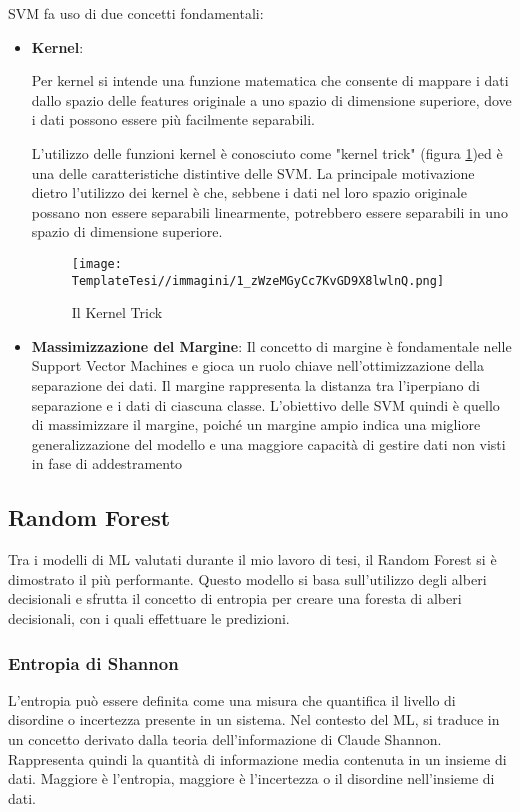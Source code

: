 \begin{flushleft}
SVM fa uso di due concetti fondamentali:

\begin{itemize}
\item \textbf{Kernel}:

     Per kernel si intende una funzione matematica che consente di mappare i dati dallo spazio delle features originale a uno spazio di dimensione superiore, dove i dati possono essere più facilmente separabili.

     L'utilizzo delle funzioni kernel è conosciuto come "kernel trick" (figura \ref{fig:kerneltrick})ed è una delle caratteristiche distintive delle SVM. La principale motivazione dietro l'utilizzo dei kernel è che, sebbene i dati nel loro spazio originale possano non essere separabili linearmente, potrebbero essere separabili in uno spazio di dimensione superiore.
    \begin{figure}[H]
        \centering
        \texttt{[image: TemplateTesi//immagini/1\_zWzeMGyCc7KvGD9X8lwlnQ.png]}
        \caption{Il Kernel Trick \cite{imm_svmkerneltrick}}
        \label{fig:kerneltrick}
    \end{figure}
    \item \textbf{Massimizzazione del Margine}:
    Il concetto di margine è fondamentale nelle Support Vector Machines e gioca un ruolo chiave nell'ottimizzazione della separazione dei dati. Il margine rappresenta la distanza tra l'iperpiano di separazione e i dati di ciascuna classe.
    L'obiettivo delle SVM quindi è quello di massimizzare il margine, poiché un margine ampio indica una migliore generalizzazione del modello e una maggiore capacità di gestire dati non visti in fase di addestramento
    \end{itemize}



\subsection{Random Forest}
Tra i modelli di ML valutati durante il mio lavoro di tesi, il Random Forest si è dimostrato il più performante. Questo modello si basa sull'utilizzo degli alberi decisionali e sfrutta il concetto di entropia per creare una foresta di alberi decisionali, con i quali effettuare le predizioni.

\subsubsection{Entropia di Shannon}
L'entropia può essere definita come una misura che quantifica il livello di disordine o incertezza presente in un sistema.
Nel contesto del ML, si traduce in un concetto derivato dalla teoria dell'informazione di Claude Shannon. Rappresenta quindi la quantità di informazione media contenuta in un insieme di dati. Maggiore è l'entropia, maggiore è l'incertezza o il disordine nell'insieme di dati.


\end{flushleft}

